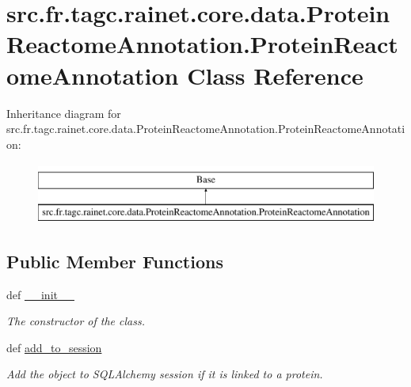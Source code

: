 \hypertarget{classsrc_1_1fr_1_1tagc_1_1rainet_1_1core_1_1data_1_1ProteinReactomeAnnotation_1_1ProteinReactomeAnnotation}{\section{src.\-fr.\-tagc.\-rainet.\-core.\-data.\-Protein\-Reactome\-Annotation.\-Protein\-Reactome\-Annotation Class Reference}
\label{classsrc_1_1fr_1_1tagc_1_1rainet_1_1core_1_1data_1_1ProteinReactomeAnnotation_1_1ProteinReactomeAnnotation}
}
Inheritance diagram for src.\-fr.\-tagc.\-rainet.\-core.\-data.\-Protein\-Reactome\-Annotation.\-Protein\-Reactome\-Annotation\-:\begin{figure}[H]
\begin{center}
\leavevmode
\includegraphics[height=2.000000cm]{classsrc_1_1fr_1_1tagc_1_1rainet_1_1core_1_1data_1_1ProteinReactomeAnnotation_1_1ProteinReactomeAnnotation}
\end{center}
\end{figure}
\subsection*{Public Member Functions}
\begin{DoxyCompactItemize}
\item 
def \hyperlink{classsrc_1_1fr_1_1tagc_1_1rainet_1_1core_1_1data_1_1ProteinReactomeAnnotation_1_1ProteinReactomeAnnotation_a822e466a59e7081ca4bb48dd321b575e}{\-\_\-\-\_\-init\-\_\-\-\_\-}
\begin{DoxyCompactList}\small\item\em The constructor of the class. \end{DoxyCompactList}\item 
\hypertarget{classsrc_1_1fr_1_1tagc_1_1rainet_1_1core_1_1data_1_1ProteinReactomeAnnotation_1_1ProteinReactomeAnnotation_a12b360a326225685f5636e2c7968d297}{def \hyperlink{classsrc_1_1fr_1_1tagc_1_1rainet_1_1core_1_1data_1_1ProteinReactomeAnnotation_1_1ProteinReactomeAnnotation_a12b360a326225685f5636e2c7968d297}{add\-\_\-to\-\_\-session}}\label{classsrc_1_1fr_1_1tagc_1_1rainet_1_1core_1_1data_1_1ProteinReactomeAnnotation_1_1ProteinReactomeAnnotation_a12b360a326225685f5636e2c7968d297}

\begin{DoxyCompactList}\small\item\em Add the object to S\-Q\-L\-Alchemy session if it is linked to a protein. \end{DoxyCompactList}\end{DoxyCompactItemize}
